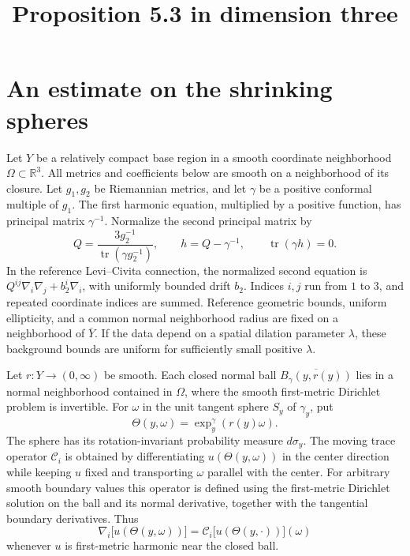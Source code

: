 \documentclass[11pt,a4paper]{article}
\title{Proposition 5.3 in dimension three}
\author{}
\date{}
\DeclareMathOperator{\tr}{tr}
\numberwithin{equation}{section}
\begin{document}
\maketitle
\setcounter{section}{4}
\section{An estimate on the shrinking spheres}

Let $Y$ be a relatively compact base region in a smooth coordinate
neighborhood $\Omega\subset\mathbb R^3$. All metrics and coefficients
below are smooth on a neighborhood of its closure. Let $g_1,g_2$ be
Riemannian metrics, and let $\gamma$ be a positive conformal multiple of
$g_1$. The first harmonic equation, multiplied by a positive function,
has principal matrix $\gamma^{-1}$. Normalize the second principal matrix by
\begin{equation}\label{balls:normalization}
 Q=\frac{3g_2^{-1}}{\tr(\gamma g_2^{-1})},\qquad
 h=Q-\gamma^{-1},\qquad \tr(\gamma h)=0.
\end{equation}
In the reference Levi--Civita connection, the normalized second equation is
$Q^{ij}\nabla_i\nabla_j+b_2^i\nabla_i$, with uniformly bounded drift $b_2$.
Indices $i,j$ run from $1$ to $3$, and repeated coordinate indices are summed.
Reference geometric bounds, uniform ellipticity, and a common normal
neighborhood radius are fixed on a neighborhood of $\overline Y$.
If the data depend on a spatial dilation parameter $\lambda$, these
background bounds are uniform for sufficiently small positive $\lambda$.

Let $r:Y\to(0,\infty)$ be smooth. Each closed normal ball
$\overline{B_\gamma(y,r(y))}$ lies in a normal neighborhood contained in
$\Omega$, where the smooth first-metric Dirichlet problem is invertible.
For $\omega$ in the unit tangent sphere $S_y$ of $\gamma_y$, put
\[
 \Theta(y,\omega)=\exp_y^\gamma(r(y)\omega).
\]
The sphere has its rotation-invariant probability measure $d\sigma_y$.
The moving trace operator $\mathcal C_i$ is obtained by differentiating
$u(\Theta(y,\omega))$ in the center direction while keeping $u$ fixed
and transporting $\omega$ parallel with the center. For arbitrary smooth
boundary values this operator is defined using the first-metric
Dirichlet solution on the ball and its normal derivative, together with
the tangential boundary derivatives. Thus
\[
 \nabla_i\bigl[u(\Theta(y,\omega))\bigr]
 =\mathcal C_i\bigl[u(\Theta(y,\cdot))\bigr](\omega)
\]
whenever $u$ is first-metric harmonic near the closed ball.
\end{document}
